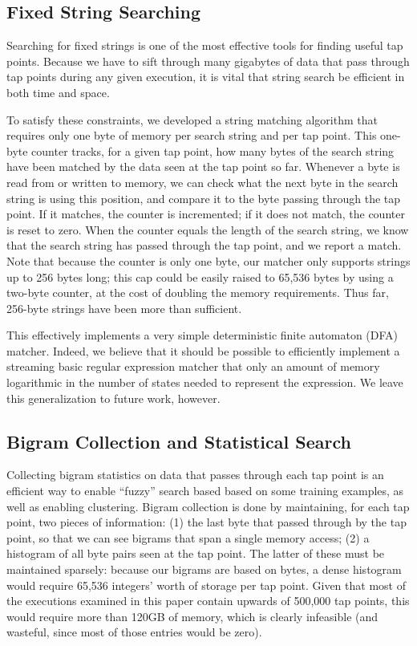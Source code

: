 \subsection{Fixed String Searching}
\label{sec:implementation:subsec:stringsearch}

Searching for fixed strings is one of the most effective tools for
finding useful tap points. Because we have to sift through many
gigabytes of data that pass through tap points during any given
execution, it is vital that string search be efficient in both time and
space.

To satisfy these constraints, we developed a string matching algorithm
that requires only one byte of memory per search string and per tap
point. This one-byte counter tracks, for a given tap point, how many
bytes of the search string have been matched by the data seen at the tap
point so far. Whenever a byte is read from or written to memory, we can
check what the next byte in the search string is using this position,
and compare it to the byte passing through the tap point. If it matches,
the counter is incremented; if it does not match, the counter is reset
to zero. When the counter equals the length of the search string, we
know that the search string has passed through the tap point, and we
report a match. Note that because the counter is only one byte, our
matcher only supports strings up to 256 bytes long; this cap could be
easily raised to 65,536 bytes by using a two-byte counter, at the cost
of doubling the memory requirements. Thus far, 256-byte strings have
been more than sufficient.

This effectively implements a very simple deterministic finite automaton
(DFA) matcher. Indeed, we believe that it should be possible to
efficiently implement a streaming basic regular expression matcher that
only an amount of memory logarithmic in the number of states needed to
represent the expression. We leave this generalization to future work,
however.

\subsection{Bigram Collection and Statistical Search}
\label{sec:implementation:subsec:bigram}

Collecting bigram statistics on data that passes through each tap point
is an efficient way to enable ``fuzzy'' search based based on some
training examples, as well as enabling clustering. Bigram collection is
done by maintaining, for each tap point, two pieces of information: (1)
the last byte that passed through by the tap point, so that we can see
bigrams that span a single memory access; (2) a histogram of all byte
pairs seen at the tap point. The latter of these must be maintained
sparsely: because our bigrams are based on bytes, a dense histogram
would require 65,536 integers' worth of storage per tap point. Given
that most of the executions examined in this paper contain upwards of
500,000 tap points, this would require more than 120GB of memory, which
is clearly infeasible (and wasteful, since most of those entries would
be zero).

